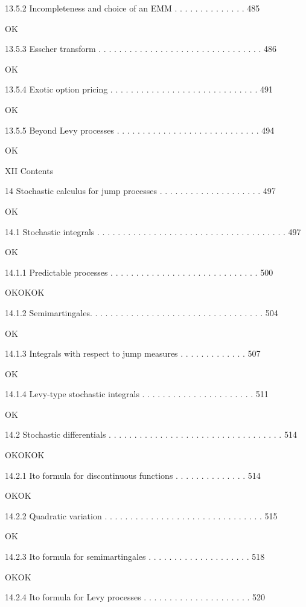 13.5.2 Incompleteness and choice of an EMM . . . . . . . . . . . . . . 485

OK

13.5.3 Esscher transform . . . . . . . . . . . . . . . . . . . . . . . . . . . . . . . . 486

OK

13.5.4 Exotic option pricing . . . . . . . . . . . . . . . . . . . . . . . . . . . . . 491

OK

13.5.5 Beyond Levy processes . . . . . . . . . . . . . . . . . . . . . . . . . . . . 494

OK

XII Contents



14 Stochastic calculus for jump processes . . . . . . . . . . . . . . . . . . . . 497

OK

14.1 Stochastic integrals . . . . . . . . . . . . . . . . . . . . . . . . . . . . . . . . . . . . . 497

OK

14.1.1 Predictable processes . . . . . . . . . . . . . . . . . . . . . . . . . . . . . 500

OKOKOK

14.1.2 Semimartingales. . . . . . . . . . . . . . . . . . . . . . . . . . . . . . . . . . 504

OK

14.1.3 Integrals with respect to jump measures . . . . . . . . . . . . . 507

OK

14.1.4 Levy-type stochastic integrals . . . . . . . . . . . . . . . . . . . . . . 511

OK

14.2 Stochastic differentials . . . . . . . . . . . . . . . . . . . . . . . . . . . . . . . . . . 514

OKOKOK

14.2.1 Ito formula for discontinuous functions . . . . . . . . . . . . . . 514

OKOK

14.2.2 Quadratic variation . . . . . . . . . . . . . . . . . . . . . . . . . . . . . . . 515

OK

14.2.3 Ito formula for semimartingales . . . . . . . . . . . . . . . . . . . . 518

OKOK

14.2.4 Ito formula for Levy processes . . . . . . . . . . . . . . . . . . . . . 520



